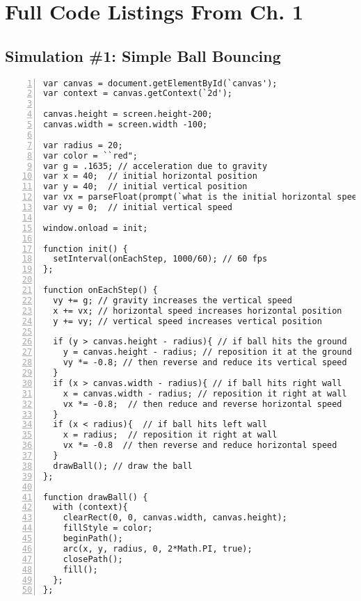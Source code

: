 
\chapter{Full Code Listings From Ch. 1} %

\label{AppendixA} %


\section{Simulation \#1:  Simple Ball Bouncing}

\begin{lstlisting}[breaklines=true, frame=single, numbers=left, caption=A basic ball bouncing simulation, label=lst:ballbounce1]
var canvas = document.getElementById(`canvas');
var context = canvas.getContext(`2d'); 

canvas.height = screen.height-200;
canvas.width = screen.width -100;

var radius = 20;
var color = ``red";
var g = .1635; // acceleration due to gravity
var x = 40;  // initial horizontal position
var y = 40;  // initial vertical position
var vx = parseFloat(prompt(`what is the initial horizontal speed of ball you would like?(recommended values of 1-20'));  // initial horizontal speed 
var vy = 0;  // initial vertical speed
 
window.onload = init; 
 
function init() {
  setInterval(onEachStep, 1000/60); // 60 fps
};
 
function onEachStep() {
  vy += g; // gravity increases the vertical speed
  x += vx; // horizontal speed increases horizontal position 
  y += vy; // vertical speed increases vertical position

  if (y > canvas.height - radius){ // if ball hits the ground
    y = canvas.height - radius; // reposition it at the ground
    vy *= -0.8; // then reverse and reduce its vertical speed
  }
  if (x > canvas.width - radius){ // if ball hits right wall
    x = canvas.width - radius; // reposition it right at wall 
    vx *= -0.8;  // then reduce and reverse horizontal speed
  }
  if (x < radius){  // if ball hits left wall
    x = radius;  // reposition it right at wall
    vx *= -0.8  // then reverse and reduce horizontal speed
  }
  drawBall(); // draw the ball
};
 
function drawBall() {
  with (context){
    clearRect(0, 0, canvas.width, canvas.height); 
    fillStyle = color;
    beginPath();
    arc(x, y, radius, 0, 2*Math.PI, true);
    closePath();
    fill();
  };
};
\end{lstlisting}

